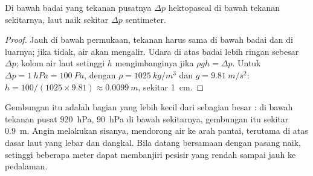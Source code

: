 \begin{proposition}\label{prop:g10:storms-and-cyclones:bulge}
Di bawah badai yang tekanan pusatnya $\Delta p$ hektopascal di bawah tekanan
sekitarnya, laut naik sekitar $\Delta p$ sentimeter.
\end{proposition}

\begin{proof}
Jauh di bawah permukaan, tekanan harus sama di bawah badai dan di luarnya;
jika tidak, air akan mengalir. Udara di atas badai lebih ringan sebesar
$\Delta p$; kolom air laut setinggi $h$ mengimbanginya jika
$\rho g h = \Delta p$. Untuk $\Delta p = \qty{1}{hPa} = \qty{100}{Pa}$, dengan
$\rho = \qty{1025}{kg/m^3}$ dan $g = \qty{9.81}{m/s^2}$: $h = 100/(1025
\times 9.81) \approx \qty{0.0099}{m}$, sekitar \qty{1}{cm}.
\end{proof}

Gembungan itu adalah bagian yang lebih kecil dari sebagian besar : di bawah tekanan pusat \qty{920}{hPa}, \qty{90}{hPa} di bawah
sekitarnya, gembungan itu sekitar \qty{0.9}{m}. Angin melakukan sisanya,
mendorong air ke arah pantai, terutama di atas dasar laut yang lebar dan
dangkal. Bila datang bersamaan dengan pasang naik,  setinggi
beberapa meter dapat membanjiri pesisir yang rendah sampai jauh ke pedalaman.

